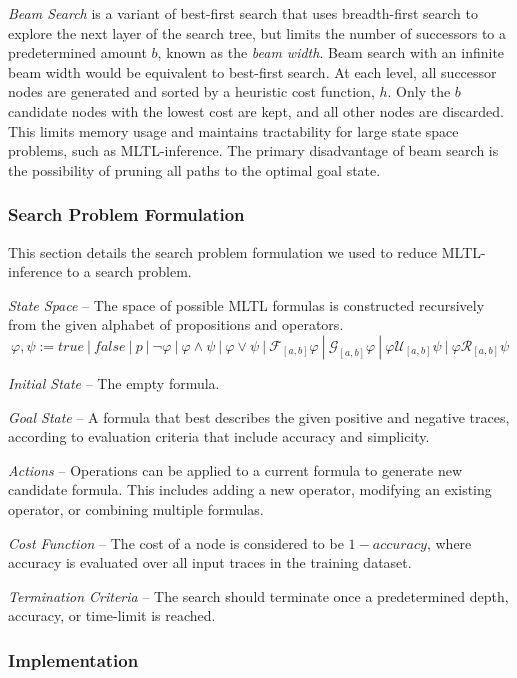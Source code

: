 \documentclass[runningheads]{llncs}
\renewcommand{\phi}{\varphi}
\begin{document}
\textit{Beam Search} is a variant of best-first search that uses breadth-first search to explore the next layer of the search tree, but limits the number of successors to a predetermined amount $b$, known as the \textit{beam width}. Beam search with an infinite beam width would be equivalent to best-first search. At each level, all successor nodes are generated and sorted by a heuristic cost function, $h$. Only the $b$ candidate nodes with the lowest cost are kept, and all other nodes are discarded. This limits memory usage and maintains tractability for large state space problems, such as MLTL-inference. The primary disadvantage of beam search is the possibility of pruning all paths to the optimal goal state.

\subsubsection{Search Problem Formulation}

This section details the search problem formulation we used to reduce MLTL-inference to a search problem.

\textit{State Space} -- The space of possible MLTL formulas is constructed recursively from the given alphabet of propositions and operators.
\[
\phi, \psi := true \ | \ false \ | \ p \ | \ \neg \phi \ | \ \phi \land \psi \ | \ \phi \lor \psi \ | \ \mathcal{F}_{[a,b]} \phi \ | \ \mathcal{G}_{[a,b]} \phi \ | \ \phi \mathcal{U}_{[a,b]} \psi \ | \ \phi \mathcal{R}_{[a,b]} \psi
\]

\textit{Initial State} -- The empty formula.

\textit{Goal State} -- A formula that best describes the given positive and negative traces, according to evaluation criteria that include accuracy and simplicity.

\textit{Actions} -- Operations can be applied to a current formula to generate new candidate formula. This includes adding a new operator, modifying an existing operator, or combining multiple formulas.

\textit{Cost Function} -- The cost of a node is considered to be $1-accuracy$, where accuracy is evaluated over all input traces in the training dataset.

\textit{Termination Criteria} -- The search should terminate once a predetermined depth, accuracy, or time-limit is reached.

\subsubsection{Implementation}
\end{document}
